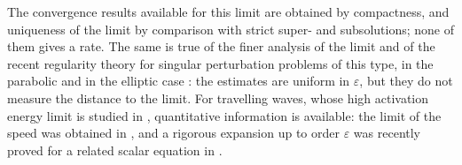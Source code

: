 \documentclass[11pt]{amsart}
\theoremstyle{definition}
\theoremstyle{remark}
\newcommand{\ve}{\varepsilon}
\begin{document}
The convergence results available for this limit
\cite{CaffarelliVazquez1995,CaffarelliLedermanWolanski1997a,FernandezBonderWolanski2000}
are obtained by compactness, and uniqueness of the limit
\cite{LedermanVazquezWolanski2001,Petrosyan2002,FernandezBonderWolanski2004} by comparison
with strict super- and subsolutions; none of them gives a rate. The same is true of
the finer analysis of the limit \cite{Weiss2003,PetrosyanYip2008,WeissZhang2009} and of
the recent regularity theory for singular perturbation problems of this type, in the
parabolic \cite{RicarteTeymurazyanUrbano2019,AudritoSanzPerela2024} and in the elliptic
case \cite{AudritoSerra2022,AraujoRicarteTeixeira2017}: the estimates are
uniform in $\ve$, but they do not measure the distance to the limit. For travelling waves, whose
high activation energy limit is studied in
\cite{BerestyckiNicolaenkoScheurer1985,Glangetas1992}, quantitative
information is available: the limit of the speed was
obtained in \cite{BerestyckiNicolaenkoScheurer1985}, and
a rigorous expansion up to order $\ve$ was recently proved for a related scalar
equation in \cite{JelbartKristiansenSzmolyan2025}.
\end{document}
